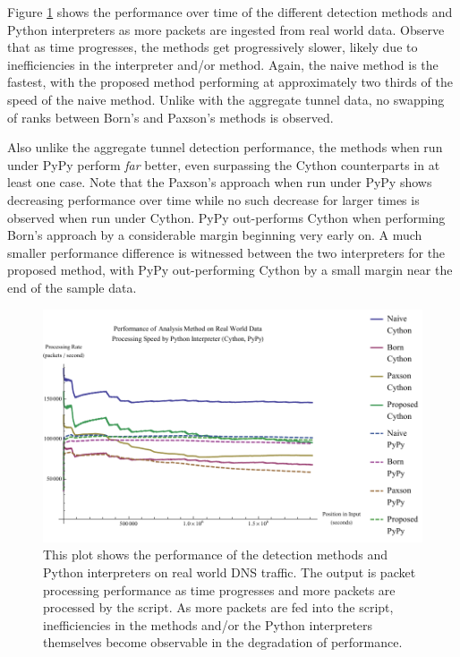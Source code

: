 \documentclass[12pt]{report}
\theoremstyle{remark}
\theoremstyle{definition}
\theoremstyle{definition}
\theoremstyle{definition}
\begin{document}
Figure \ref{pmqr} shows the performance over time of the different detection
methods and Python interpreters as more packets are ingested from real world
data. Observe that as time progresses, the methods get progressively slower,
likely due to inefficiencies in the interpreter and/or method. Again, the naive
method is the fastest, with the proposed method performing at approximately two
thirds of the speed of the naive method. Unlike with the aggregate tunnel data,
no swapping of ranks between Born's and Paxson's methods is observed.

Also unlike the aggregate tunnel detection performance, the methods when run
under PyPy perform \emph{far} better, even surpassing the Cython counterparts in
at least one case. Note that the Paxson's approach when run under PyPy shows
decreasing performance over time while no such decrease for larger times is
observed when run under Cython. PyPy out-performs Cython when performing Born's
approach by a considerable margin beginning very early on. A much smaller
performance difference is witnessed between the two interpreters for the
proposed method, with PyPy out-performing Cython by a small margin near the end
of the sample data.

\begin{figure}
\centering
\includegraphics[width=\textwidth]{../figures/pmqr.pdf}
\caption[Performance of Analysis Method and Python Interpreter on Real World
Data]{This plot shows the performance of the detection methods and Python
interpreters on real world DNS traffic. The output is packet processing performance as time
progresses and more packets are processed by the script. As more packets are fed
into the script, inefficiencies in the methods and/or the Python interpreters
themselves become observable in the degradation of performance.}
\label{pmqr}
\end{figure}
\end{document}
